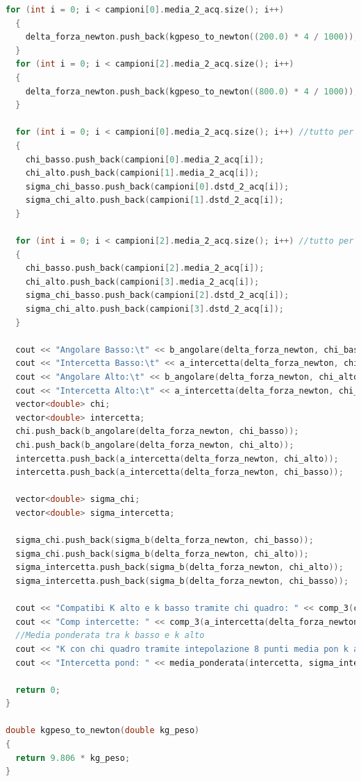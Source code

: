 \documentclass[a4paper,11pt,oneside]{article}
\begin{document}
\begin{lstlisting}[language=C++, label=lst:analisi_2ac, caption=analisi\_2ac]
  for (int i = 0; i < campioni[0].media_2_acq.size(); i++)
  {
    delta_forza_newton.push_back(kgpeso_to_newton((200.0) * 4 / 1000));
  }
  for (int i = 0; i < campioni[2].media_2_acq.size(); i++) 
  {
    delta_forza_newton.push_back(kgpeso_to_newton((800.0) * 4 / 1000));
  }

  for (int i = 0; i < campioni[0].media_2_acq.size(); i++) //tutto per 400
  {
    chi_basso.push_back(campioni[0].media_2_acq[i]);
    chi_alto.push_back(campioni[1].media_2_acq[i]);
    sigma_chi_basso.push_back(campioni[0].dstd_2_acq[i]);
    sigma_chi_alto.push_back(campioni[1].dstd_2_acq[i]);
  }

  for (int i = 0; i < campioni[2].media_2_acq.size(); i++) //tutto per i 1000
  {
    chi_basso.push_back(campioni[2].media_2_acq[i]);
    chi_alto.push_back(campioni[3].media_2_acq[i]);
    sigma_chi_basso.push_back(campioni[2].dstd_2_acq[i]);
    sigma_chi_alto.push_back(campioni[3].dstd_2_acq[i]);
  }

  cout << "Angolare Basso:\t" << b_angolare(delta_forza_newton, chi_basso) << " +/- " << sigma_b(delta_forza_newton, chi_basso) << endl;
  cout << "Intercetta Basso:\t" << a_intercetta(delta_forza_newton, chi_basso) << " +/- " << sigma_a(delta_forza_newton, chi_basso) << endl;
  cout << "Angolare Alto:\t" << b_angolare(delta_forza_newton, chi_alto) << " +/- " << sigma_b(delta_forza_newton, chi_alto) << endl;
  cout << "Intercetta Alto:\t" << a_intercetta(delta_forza_newton, chi_alto) << " +/- " << sigma_a(delta_forza_newton, chi_alto) << endl;
  vector<double> chi;
  vector<double> intercetta;
  chi.push_back(b_angolare(delta_forza_newton, chi_basso));
  chi.push_back(b_angolare(delta_forza_newton, chi_alto));
  intercetta.push_back(a_intercetta(delta_forza_newton, chi_alto));
  intercetta.push_back(a_intercetta(delta_forza_newton, chi_basso));

  vector<double> sigma_chi;
  vector<double> sigma_intercetta;

  sigma_chi.push_back(sigma_b(delta_forza_newton, chi_basso));
  sigma_chi.push_back(sigma_b(delta_forza_newton, chi_alto));
  sigma_intercetta.push_back(sigma_b(delta_forza_newton, chi_alto));
  sigma_intercetta.push_back(sigma_b(delta_forza_newton, chi_basso));

  cout << "Compatibi K alto e k basso tramite chi quadro: " << comp_3(chi[0], chi[1], sigma_chi[0], sigma_chi[1]) << endl;
  cout << "Comp intercette: " << comp_3(a_intercetta(delta_forza_newton, chi_basso), a_intercetta(delta_forza_newton, chi_alto), sigma_a(delta_forza_newton, chi_basso), sigma_a(delta_forza_newton, chi_alto)) << endl;
  //Media ponderata tra k basso e k alto
  cout << "K con chi quadro tramite intepolazione 8 punti media pon k alto e K basso):\t" << media_ponderata(chi, sigma_chi) << " +/- " << errore_media_ponderata(sigma_chi) << endl;
  cout << "Intercetta pond: " << media_ponderata(intercetta, sigma_intercetta) << "+/-" << errore_media_ponderata(sigma_intercetta) << endl;

  return 0;
}

double kgpeso_to_newton(double kg_peso)
{
  return 9.806 * kg_peso;
}
\end{lstlisting}
\end{document}

